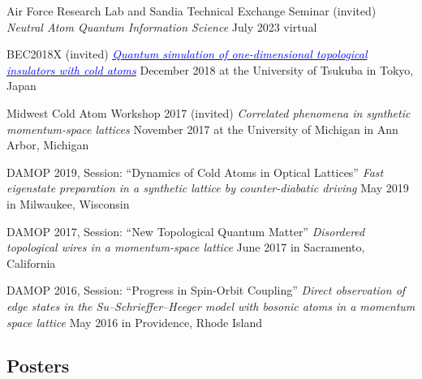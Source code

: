 \documentclass[12pt,letterpaper,sans]{moderncv}
\newcommand*{\blink}[2]{\textit{\href{#1}{\textcolor{blue}{#2}}}}
\begin{document}
\begin{etaremune}[topsep=0pt,itemsep=4pt,partopsep=0pt,parsep=0pt]

\item Air Force Research Lab and Sandia Technical Exchange Seminar (invited)
\newline
\emph{Neutral Atom Quantum Information Science}
\newline
July 2023 virtual

\item BEC2018X (invited)
\newline 
\blink{http://thetis.ph.tsukuba.ac.jp/~hatsugai/modules/pico4/workshop2018x/meie.pdf}{Quantum simulation of one-dimensional topological insulators with cold atoms}
\newline 
December 2018 at the University of Tsukuba in Tokyo, Japan

\item Midwest Cold Atom Workshop 2017 (invited)
\newline 
\emph{Correlated phenomena in synthetic momentum-space lattices}
\newline 
November 2017 at the University of Michigan in Ann Arbor, Michigan

\item DAMOP 2019, Session: ``Dynamics of Cold Atoms in Optical Lattices''
\newline 
\emph{Fast eigenstate preparation in a synthetic lattice by counter-diabatic driving}
\newline 
May 2019 in Milwaukee, Wisconsin

\item DAMOP 2017, Session: ``New Topological Quantum Matter''
\newline 
\emph{Disordered topological wires in a momentum-space lattice}
\newline 
June 2017 in Sacramento, California

\item DAMOP 2016, Session: ``Progress in Spin-Orbit Coupling''
\newline 
\emph{Direct observation of edge states in the Su--Schrieffer--Heeger model with bosonic atoms in a momentum space lattice}
\newline 
May 2016 in Providence, Rhode Island

\end{etaremune}

\subsection{Posters}
\end{document}
